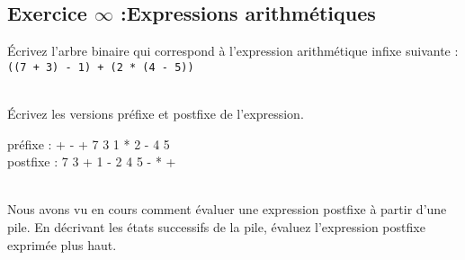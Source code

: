 \documentclass[iutinfo,a4paper,corrections,10pt]{ustl-tdtp}
\date{\annee{2017}--\annee{2018}}
\begin{document}
\maketitle
\thispagestyle{empty}



\subsection*{Exercice $\infty$ :Expressions arithmétiques}


\question Écrivez l'arbre binaire qui correspond à l'expression arithmétique infixe suivante : \\
\texttt{((7 + 3) - 1) + (2 * (4 - 5))}


\begin{solution}
{\color{red}

}
\end{solution}

~\\ \question Écrivez les versions préfixe et postfixe de l'expression.

\begin{solution}
{\color{red}
préfixe : + - + 7 3 1 * 2 - 4 5  \\
postfixe : 7 3 + 1 - 2 4 5 - * +

}
\end{solution}

~\\ \question Nous avons vu en cours comment évaluer une expression postfixe à partir d'une pile. En décrivant les états successifs de la pile, évaluez l'expression postfixe exprimée plus haut.
\end{document}
